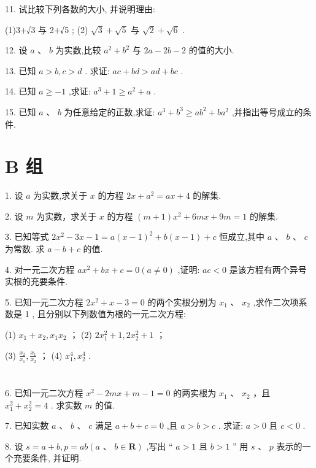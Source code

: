 \documentclass[10pt]{article}
\begin{document}
11. 试比较下列各数的大小, 并说明理由:

(1)3+√3 与 2+√5 ; (2) \(\sqrt{3} + \sqrt{5}\) 与 \(\sqrt{2} + \sqrt{6}\) .

12. 设 \(a\text{ 、 }b\) 为实数,比较 \({a}^{2} + {b}^{2}\) 与 \({2a} - {2b} - 2\) 的值的大小.

13. 已知 \(a > b,c > d\) . 求证: \({ac} + {bd} > {ad} + {bc}\) .

14. 已知 \(a \geq   - 1\) ,求证: \({a}^{3} + 1 \geq  {a}^{2} + a\) .

15. 已知 \(a\text{ 、 }b\) 为任意给定的正数,求证: \({a}^{3} + {b}^{3} \geq  a{b}^{2} + b{a}^{2}\) ,并指出等号成立的条件.

\section*{B 组}

1. 设 \(a\) 为实数,求关于 \(x\) 的方程 \({2x} + {a}^{2} = {ax} + 4\) 的解集.

2. 设 \(m\) 为实数，求关于 \(x\) 的方程 \(\left( {m + 1}\right) {x}^{2} + {6mx} + {9m} = 1\) 的解集.

3. 已知等式 \(2{x}^{2} - {3x} - 1 = a{\left( x - 1\right) }^{2} + b\left( {x - 1}\right)  + c\) 恒成立,其中 \(a\text{ 、 }b\text{ 、 }c\) 为常数. 求 \(a - b + c\) 的值.

4. 对一元二次方程 \(a{x}^{2} + {bx} + c = 0\left( {a \neq  0}\right)\) ,证明: \({ac} < 0\) 是该方程有两个异号实根的充要条件.

5. 已知一元二次方程 \(2{x}^{2} + x - 3 = 0\) 的两个实根分别为 \({x}_{1}\text{ 、 }{x}_{2}\) ,求作二次项系数是 1 , 且分别以下列数值为根的一元二次方程:

(1) \({x}_{1} + {x}_{2},{x}_{1}{x}_{2}\) ； (2) \(2{x}_{1}^{2} + 1,2{x}_{2}^{2} + 1\) ；

(3) \(\frac{{x}_{2}}{{x}_{1}},\frac{{x}_{1}}{{x}_{2}}\) ； (4) \({x}_{1}^{4},{x}_{2}^{4}\) .

\section*{}

6. 已知一元二次方程 \({x}^{2} - {2mx} + m - 1 = 0\) 的两实根为 \({x}_{1}\text{ 、 }{x}_{2}\) ，且 \({x}_{1}^{2} + {x}_{2}^{2} = 4\) . 求实数 \(m\) 的值.

7. 已知实数 \(a\text{ 、 }b\text{ 、 }c\) 满足 \(a + b + c = 0\) ,且 \(a > b > c\) . 求证: \(a > 0\) 且 \(c < 0\) .

8. 设 \(s = a + b,p = {ab}\left( {a\text{ 、 }b \in  \mathbf{R}}\right)\) ,写出 “ \(a > 1\) 且 \(b > 1\) ” 用 \(s\text{ 、 }p\) 表示的一个充要条件, 并证明.
\end{document}
